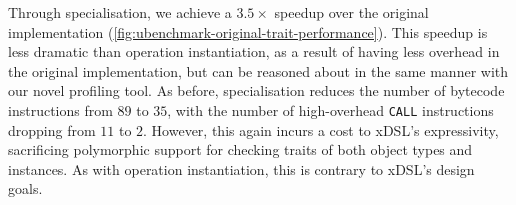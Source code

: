 Through specialisation, we achieve a $3.5\times$ speedup over the original implementation (\autoref{fig:ubenchmark-original-trait-performance}).
This speedup is less dramatic than operation instantiation, as a result of having less overhead in the original implementation, but can be reasoned about in the same manner with our novel profiling tool. As before, specialisation reduces the number of bytecode instructions from $89$ to $35$, with the number of high-overhead \texttt{CALL} instructions dropping from $11$ to $2$.
However, this again incurs a cost to xDSL's expressivity, sacrificing polymorphic support for checking traits of both object types and instances. As with operation instantiation, this is contrary to xDSL's design goals. %


